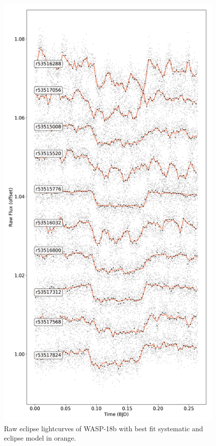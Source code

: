 \begin{subappendices}
\begin{figure}
    \centering
    \includegraphics[height=\textheight]{Rawlightcurves_W18b.png}
    \caption{Raw eclipse lightcurves of WASP-18b with best fit systematic and eclipse model in orange.}
    \label{P3:fig:rawlcs}
\end{figure}


\end{subappendices}
